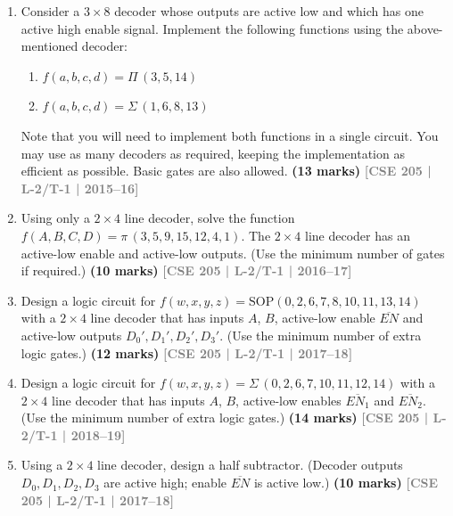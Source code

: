 \documentclass[12pt,a4paper]{article}
\newcommand{\yr}[1]{\hfill\textcolor{gray}{\small\textbf{[#1]}}}
\newcommand{\mk}[1]{\textcolor{orange!70!black}{\small\textbf{(#1 marks)}}}
\begin{document}
\begin{enumerate}

\item Consider a $3 \times 8$ decoder whose outputs are active low and which has one active high enable signal. Implement the following functions using the above-mentioned decoder:
\begin{enumerate}
  \item $f(a,b,c,d) = \Pi\,(3,5,14)$
  \item $f(a,b,c,d) = \Sigma\,(1,6,8,13)$
  
  \end{enumerate}
Note that you will need to implement both functions in a single circuit. You may use as many decoders as required, keeping the implementation as efficient as possible. Basic gates are also allowed.
\mk{13} \yr{CSE 205 | L-2/T-1 | 2015--16}


\item Using only a $2 \times 4$ line decoder, solve the function $f(A,B,C,D) = \pi\,(3,5,9,15,12,4,1)$. The $2\times4$ line decoder has an active-low enable and active-low outputs. (Use the minimum number of gates if required.)
\mk{10} \yr{CSE 205 | L-2/T-1 | 2016--17}

\item Design a logic circuit for $f(w, x, y, z) = \mathrm{SOP}(0, 2, 6, 7, 8, 10, 11, 13, 14)$ with a $2\times4$ line decoder that has inputs $A$, $B$, active-low enable $\overline{EN}$ and active-low outputs $D_0', D_1', D_2', D_3'$. (Use the minimum number of extra logic gates.)
\mk{12} \yr{CSE 205 | L-2/T-1 | 2017--18}

\item Design a logic circuit for $f(w, x, y, z) = \Sigma\,(0, 2, 6, 7, 10, 11, 12, 14)$ with a $2\times4$ line decoder that has inputs $A$, $B$, active-low enables $\overline{EN_1}$ and $\overline{EN_2}$. (Use the minimum number of extra logic gates.)
\mk{14} \yr{CSE 205 | L-2/T-1 | 2018--19}

\item Using a $2 \times 4$ line decoder, design a half subtractor. (Decoder outputs $D_0, D_1, D_2, D_3$ are active high; enable $\overline{EN}$ is active low.)
\mk{10} \yr{CSE 205 | L-2/T-1 | 2017--18}


\end{enumerate}
\end{document}
